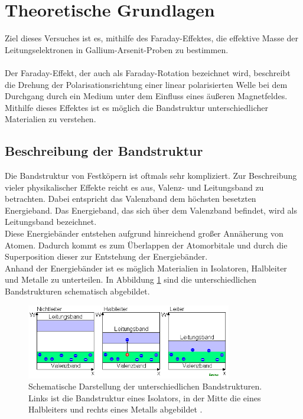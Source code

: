 \section{Theoretische Grundlagen}
Ziel dieses Versuches ist es, mithilfe des Faraday-Effektes, die effektive Masse der Leitungselektronen in
Gallium-Arsenit-Proben zu bestimmen. \\
\\
Der Faraday-Effekt, der auch als Faraday-Rotation bezeichnet wird, beschreibt die Drehung der
Polarisationsrichtung einer linear polarisierten Welle bei dem Durchgang durch ein Medium
unter dem Einfluss eines äußeren Magnetfeldes. Mithilfe dieses Effektes ist es möglich die
Bandstruktur unterschiedlicher Materialien zu verstehen. \\

\subsection{Beschreibung der Bandstruktur}
Die Bandstruktur von Festköpern ist oftmals sehr kompliziert. Zur Beschreibung vieler physikalischer
Effekte reicht es aus, Valenz- und Leitungsband zu betrachten.
Dabei entspricht das Valenzband dem höchsten besetzten Energieband. Das Energieband, das sich über dem
Valenzband befindet, wird als Leitungsband bezeichnet. \\
Diese Energiebänder entstehen aufgrund hinreichend großer Annäherung von Atomen. Dadurch kommt es zum
Überlappen der Atomorbitale und durch die Superposition dieser zur Entstehung der Energiebänder. \\
Anhand der Energiebänder ist es möglich Materialien in Isolatoren, Halbleiter und Metalle zu unterteilen.
In Abbildung \ref{fig:Bandstrukturen} sind die unterschiedlichen Bandstrukturen schematisch abgebildet.
\begin{figure}[H]
    \centering
    \includegraphics[width=0.8\textwidth]{images/Bandstruktur.png}
    \caption{Schematische Darstellung der unterschiedlichen Bandstrukturen. Links ist die Bandstruktur eines Isolators,
    in der Mitte die eines Halbleiters und rechts eines Metalls abgebildet \cite{BS}.}
    \label{fig:Bandstrukturen}
\end{figure} \noindent
